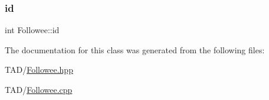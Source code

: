 \mbox{\label{class_followee_adb7f286786c98683b50f1749c911a758}} 
\subsubsection{\texorpdfstring{id}{id}}
{\footnotesize\ttfamily int Followee\+::id\hspace{0.3cm}{\ttfamily [private]}}



The documentation for this class was generated from the following files\+:\begin{DoxyCompactItemize}
\item 
T\+A\+D/\hyperlink{_followee_8hpp}{Followee.\+hpp}\item 
T\+A\+D/\hyperlink{_followee_8cpp}{Followee.\+cpp}\end{DoxyCompactItemize}

